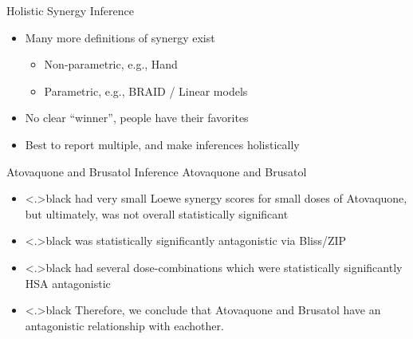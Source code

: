 \documentclass{beamer}
\begin{document}
\begin{frame}{Holistic Synergy Inference}
    \begin{itemize}
        \item Many more definitions of synergy exist \begin{itemize}
            \item Non-parametric, e.g., Hand 
            \item Parametric, e.g., BRAID / Linear models
        \end{itemize}
        \item No clear ``winner'', people have their favorites
        \item Best to report multiple, and make inferences holistically
    \end{itemize}
\end{frame}
    
\begin{frame}{Atovaquone and Brusatol Inference}
    Atovaquone and Brusatol \begin{itemize}[<+->]\color{gray}
        \item \color<.>{black} had very small Loewe synergy scores for small doses of Atovaquone, but ultimately, was not overall statistically significant
        \item \color<.>{black} was statistically significantly antagonistic via Bliss/ZIP 
        \item \color<.>{black} had several dose-combinations which were statistically significantly HSA antagonistic
        \item \color<.>{black} Therefore, we conclude that Atovaquone and Brusatol have an antagonistic relationship with eachother.
    \end{itemize}
\end{frame}
\end{document}
